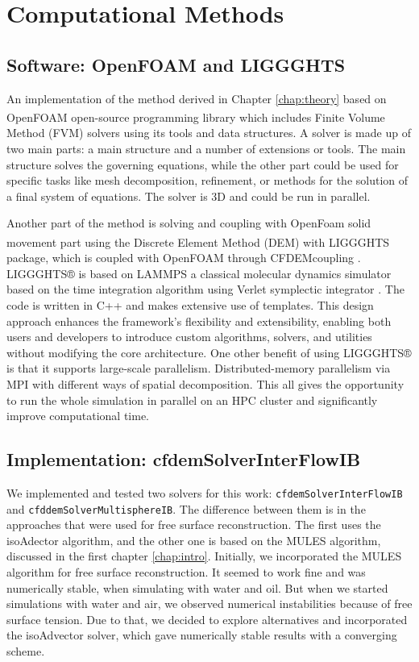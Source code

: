 \chapter{Computational Methods} \label{chap:comp_met}

\section{Software: OpenFOAM and LIGGGHTS}
An implementation of the method derived in Chapter \ref{chap:theory} based on OpenFOAM\textsuperscript{\textregistered} \cite{jasak2007openfoam} open-source programming library which includes Finite Volume Method (FVM) solvers using its tools and data structures. A solver is made up of two main parts: a main structure and a number of extensions or tools. The main structure solves the governing equations, while the other part could be used for specific tasks like mesh decomposition, refinement, or methods for the solution of a final system of equations. The solver is 3D and could be run in parallel.

Another part of the method is solving and coupling with OpenFoam solid movement part using the Discrete Element Method (DEM) with LIGGGHTS\textsuperscript{\textregistered} package, which is coupled with OpenFOAM through CFDEMcoupling \cite{kloss2011liggghts}. LIGGGHTS® is based on LAMMPS \cite{LAMMPS} a classical molecular dynamics simulator based on the time integration algorithm using Verlet symplectic integrator \cite{verlet}. The code is written in C++ and makes extensive use of templates. This design approach enhances the framework's flexibility and extensibility, enabling both users and developers to introduce custom algorithms, solvers, and utilities without modifying the core architecture. One other benefit of using LIGGGHTS® is that it supports large-scale parallelism. Distributed-memory parallelism via MPI\cite{MPI} with different ways of spatial decomposition. This all gives the opportunity to run the whole simulation in parallel on an HPC cluster and significantly improve computational time.

\section{Implementation: cfdemSolverInterFlowIB}
We implemented and tested two solvers for this work: \verb|cfdemSolverInterFlowIB| and \verb|cfddemSolverMultisphereIB|. The difference between them is in the approaches that were used for free surface reconstruction. The first uses the isoAdector \cite{roenby2019isoadvector} algorithm, and the other one is based on the MULES \cite{MULES} algorithm, discussed in the first chapter \ref{chap:intro}. Initially, we incorporated the MULES algorithm for free surface reconstruction. It seemed to work fine and was numerically stable, when simulating with water and oil. But when we started simulations with water and air, we observed numerical instabilities because of free surface tension. Due to that, we decided to explore alternatives and incorporated the isoAdvector solver, which gave numerically stable results with a converging scheme.

